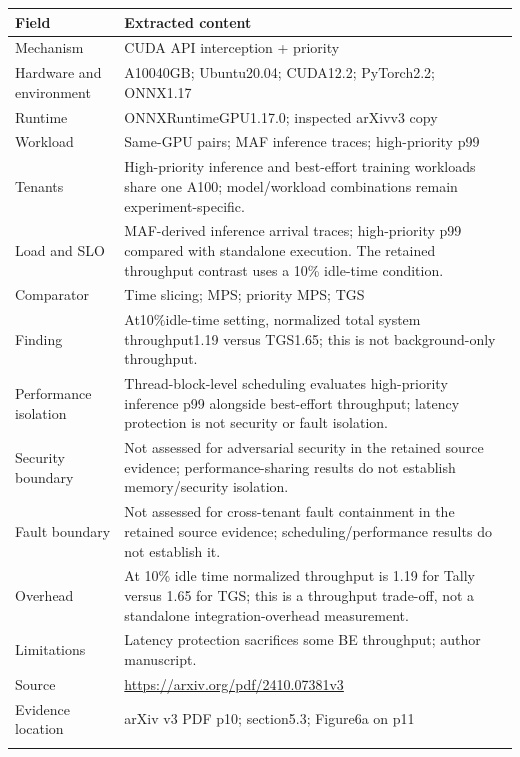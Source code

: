 \cite{P022}

\begin{longtable}{>{\raggedright\arraybackslash}p{}>{\raggedright\arraybackslash}p{}}
\toprule
\textbf{Field} & \textbf{Extracted content}\\\midrule\endhead
Mechanism & CUDA API interception + priority\\\addlinespace
Hardware and environment & A10040GB; Ubuntu20.04; CUDA12.2; PyTorch2.2; ONNX1.17\\\addlinespace
Runtime & ONNXRuntimeGPU1.17.0; inspected arXivv3 copy\\\addlinespace
Workload & Same-GPU pairs; MAF inference traces; high-priority p99\\\addlinespace
Tenants & High-priority inference and best-effort training workloads share one A100; model/workload combinations remain experiment-specific.\\\addlinespace
Load and SLO & MAF-derived inference arrival traces; high-priority p99 compared with standalone execution. The retained throughput contrast uses a 10\% idle-time condition.\\\addlinespace
Comparator & Time slicing; MPS; priority MPS; TGS\\\addlinespace
Finding & At10\%idle-time setting, normalized total system throughput1.19 versus TGS1.65; this is not background-only throughput.\\\addlinespace
Performance isolation & Thread-block-level scheduling evaluates high-priority inference p99 alongside best-effort throughput; latency protection is not security or fault isolation.\\\addlinespace
Security boundary & Not assessed for adversarial security in the retained source evidence; performance-sharing results do not establish memory/security isolation.\\\addlinespace
Fault boundary & Not assessed for cross-tenant fault containment in the retained source evidence; scheduling/performance results do not establish it.\\\addlinespace
Overhead & At 10\% idle time normalized throughput is 1.19 for Tally versus 1.65 for TGS; this is a throughput trade-off, not a standalone integration-overhead measurement.\\\addlinespace
Limitations & Latency protection sacrifices some BE throughput; author manuscript.\\\addlinespace
Source & \url{https://arxiv.org/pdf/2410.07381v3}\\\addlinespace
Evidence location & arXiv v3 PDF p10; section5.3; Figure6a on p11\\\addlinespace
\bottomrule\end{longtable}

